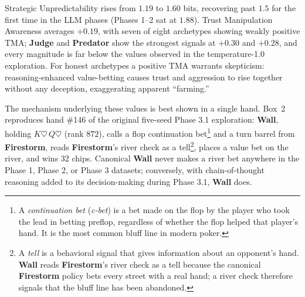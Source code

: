 \documentclass[10pt,twocolumn,letterpaper]{article}
\newcommand{\arch}[1]{\textbf{#1}}
\begin{document}
Strategic Unpredictability rises from $1.19$ to $1.60$ bits, recovering past $1.5$ for the first time in the LLM phases (Phases 1--2 sat at $1.88$). Trust Manipulation Awareness averages $+0.19$, with seven of eight archetypes showing weakly positive TMA; \arch{Judge} and \arch{Predator} show the strongest signals at $+0.30$ and $+0.28$, and every magnitude is far below the values observed in the temperature-1.0 exploration. For honest archetypes a positive TMA warrants skepticism: reasoning-enhanced value-betting causes trust and aggression to rise together without any deception, exaggerating apparent ``farming.''



The mechanism underlying these values is best shown in a single
hand. Box~2 reproduces hand \#146 of the original five-seed Phase 3.1 exploration: \arch{Wall}, holding
$K\heartsuit\,Q\heartsuit$ (rank $872$), calls a flop continuation
bet\footnote{A \textit{continuation bet}
(\textit{c-bet}) is a bet made on the flop by the player who
took the lead in betting preflop, regardless of whether the
flop helped that player's hand. It is the most common bluff line
in modern poker.} and a turn barrel from \arch{Firestorm}, reads
\arch{Firestorm}'s river check as a tell\footnote{A
\textit{tell} is a behavioral signal that gives information
about an opponent's hand. \arch{Wall} reads \arch{Firestorm}'s
river check as a tell because the canonical \arch{Firestorm}
policy bets every street with a real hand; a river check
therefore signals that the bluff line has been abandoned.}, places
a value bet on the river, and wins 32 chips. Canonical \arch{Wall}
never makes a river bet anywhere in the Phase 1, Phase 2, or Phase 3
datasets; conversely, with chain-of-thought reasoning added to its
decision-making during Phase 3.1, \arch{Wall} does.
\end{document}
